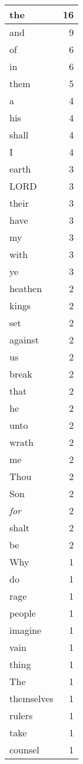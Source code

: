 \begin{center}
\begin{longtable}{l|r}
\hline \hline
\endlastfoot
the & 16 \\ \hline
and & 9 \\ \hline
of & 6 \\ \hline
in & 6 \\ \hline
them & 5 \\ \hline
a & 4 \\ \hline
his & 4 \\ \hline
shall & 4 \\ \hline
I & 4 \\ \hline
earth & 3 \\ \hline
LORD & 3 \\ \hline
their & 3 \\ \hline
have & 3 \\ \hline
my & 3 \\ \hline
with & 3 \\ \hline
ye & 3 \\ \hline
heathen & 2 \\ \hline
kings & 2 \\ \hline
set & 2 \\ \hline
against & 2 \\ \hline
us & 2 \\ \hline
break & 2 \\ \hline
that & 2 \\ \hline
he & 2 \\ \hline
unto & 2 \\ \hline
wrath & 2 \\ \hline
me & 2 \\ \hline
Thou & 2 \\ \hline
Son & 2 \\ \hline
\emph{for} & 2 \\ \hline
shalt & 2 \\ \hline
be & 2 \\ \hline
Why & 1 \\ \hline
do & 1 \\ \hline
rage & 1 \\ \hline
people & 1 \\ \hline
imagine & 1 \\ \hline
vain & 1 \\ \hline
thing & 1 \\ \hline
The & 1 \\ \hline
themselves & 1 \\ \hline
rulers & 1 \\ \hline
take & 1 \\ \hline
counsel & 1 \\ \hline

\end{longtable}
\end{center}
